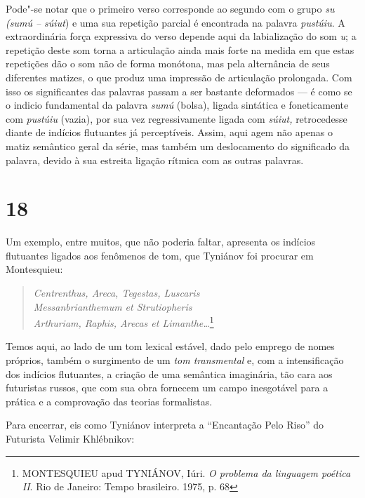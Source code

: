 Pode"-se notar que o primeiro verso corresponde ao segundo com o grupo
\emph{su (sumú -- súiut}) e uma sua repetição parcial é encontrada na
palavra \emph{pustúiu}. A extraordinária força expressiva do verso
depende aqui da labialização do som \emph{u}; a repetição deste som torna a
articulação ainda mais forte na medida em que estas repetições dão o som
não de forma monótona, mas pela alternância de seus diferentes matizes,
o que produz uma impressão de articulação prolongada. Com isso os
significantes das palavras passam a ser bastante deformados --- é como se
o indicio fundamental da palavra \emph{sumú} (bolsa), ligada sintática e
foneticamente com \emph{pustúiu} (vazia), por sua vez regressivamente
ligada com \emph{súiut,} retrocedesse diante de indícios flutuantes já
perceptíveis. Assim, aqui agem não apenas o matiz semântico geral da
série, mas também um deslocamento do significado da palavra, devido à
sua estreita ligação rítmica com as outras palavras.

\section{18}

Um exemplo, entre muitos, que não poderia faltar, apresenta os indícios
flutuantes ligados aos fenômenos de tom, que Tyniánov foi procurar em
Montesquieu:

\begin{verse}
\emph{Centrenthus, Areca, Tegestas, Luscaris} \\
\emph{Messanbrianthemum et Strutiopheris} \\
\emph{Arthuriam, Raphis, Arecas et Limanthe\ldots{}}\footnote{MONTESQUIEU
  apud TYNIÁNOV, Iúri. \emph{O problema da linguagem poética II}. Rio de
  Janeiro: Tempo brasileiro. 1975, p. 68}
\end{verse}

Temos aqui, ao lado de um tom lexical estável, dado pelo emprego de
nomes próprios, também o surgimento de um \emph{tom transmental} e, com
a intensificação dos indícios flutuantes, a criação de uma semântica
imaginária, tão cara aos futuristas russos, que com sua obra fornecem um
campo inesgotável para a prática e a comprovação das teorias
formalistas.

Para encerrar, eis como Tyniánov interpreta a ``Encantação Pelo Riso''
do Futurista Velimir Khlébnikov:

